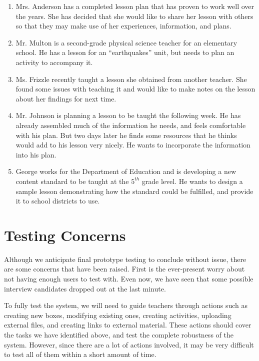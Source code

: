 \documentclass[12pt,titlepage]{article}
\begin{document}
\begin{enumerate}
\item Mrs. Anderson has a completed lesson plan that has proven to work well over
      the years.  She has decided that she would like to share her lesson with
      others so that they may make use of her experiences, information, and
      plans.

\item Mr. Multon is a second-grade physical science teacher for an elementary school.
      He has a lesson for an ``earthquakes'' unit, but needs to plan an activity
      to accompany it.

\item Ms. Frizzle recently taught a lesson she obtained from another teacher.  She
      found some issues with teaching it and would like to make notes on the lesson
      about her findings for next time.

\item Mr. Johnson is planning a lesson to be taught the following week.  He has
      already assembled much of the information he needs, and feels comfortable
      with his plan.  But two days later he finds some resources that he thinks
      would add to his lesson very nicely.  He wants to incorporate the information
      into his plan.

\item George works for the Department of Education and is developing a new content
      standard to be taught at the $5^{th}$ grade level.  He wants to design a
      sample lesson demonstrating how the standard could be fulfilled, and provide
      it to school districts to use.
\end{enumerate}

\section{Testing Concerns}
Although we anticipate final prototype testing to conclude without issue, there are
some concerns that have been raised.  First is the ever-present worry about not
having enough users to test with.  Even now, we have seen that some possible
interview candidates dropped out at the last minute.

To fully test the system, we will need to guide teachers through actions such as
creating new boxes, modifying existing ones, creating activities, uploading external
files, and creating links to external material.  These actions should cover the
tasks we have identified above, and test the complete robustness of the system.
However, since there are a lot of actions involved, it may be very difficult to
test all of them within a short amount of time.
\end{document}
